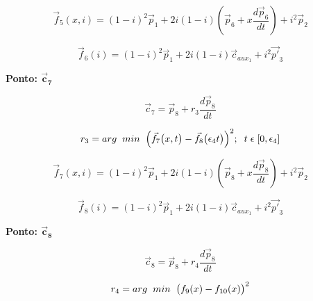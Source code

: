 \documentclass[10pt,a4paper]{report}
\begin{document}
\begin{equation}
\vec{f}_{5}(x, i) = (1 - i)^{2} \vec{p}_{1} + 2 i (1 - i) (\vec{p}_{6} + x \frac{d \vec{p}_{6}}{dt}) + i^{2} \vec{p}_{2}
\label{eq:f5}
\end{equation}

\begin{equation}
\vec{f}_{6}(i) = (1 - i)^{2} \vec{p}_{1} + 2 i (1 - i) \vec{c}_{aux_{1}} + i^{2} \vec{p'}_{3}
\label{eq:f6}
\end{equation}

\textbf{Ponto: {$\boldsymbol{\vec{c}_{7}}$}}

\begin{equation}
\vec{c}_{7} = \vec{p}_{8} + r_{3} \frac{d \vec{p}_{8}}{dt}
\label{eq:c7}
\end{equation}

\begin{equation}
r_{3} = arg \hspace{0.2cm} min \hspace{0.2cm} \Big( \vec{f}_{7} \big( x, t \big) - \vec{f}_{8} \big( \epsilon_{4} t \big) \Big) ^{2}; \hspace{0.2cm}  t \hspace{0.1cm}  \epsilon \hspace{0.1cm}  [0, \epsilon_{4}]
\label{eq:r3}
\end{equation}

\begin{equation}
\vec{f}_{7}(x, i) = (1 - i)^{2} \vec{p}_{1} + 2 i (1 - i) (\vec{p}_{8} + x \frac{d \vec{p}_{8}}{dt}) + i^{2} \vec{p}_{2}
\label{eq:f7}
\end{equation}

\begin{equation}
\vec{f}_{8}(i) = (1 - i)^{2} \vec{p}_{1} + 2 i (1 - i) \vec{c}_{aux_{1}} + i^{2} \vec{p'}_{3}
\label{eq:f8}
\end{equation}

\textbf{Ponto: {$\boldsymbol{\vec{c}_{8}}$}}

\begin{equation}
\vec{c}_{8} = \vec{p}_{8} + r_{4} \frac{d \vec{p}_{8}}{dt}
\label{eq:c8}
\end{equation}

\begin{equation}
r_{4} = arg \hspace{0.2cm} min \hspace{0.2cm} \big( f_{9}(x) - f_{10}(x) \big) ^{2}
\label{eq:r4}
\end{equation}
\end{document}
